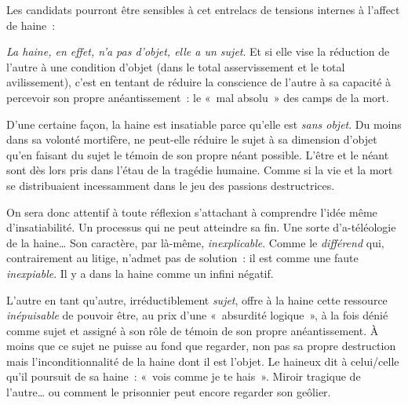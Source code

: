 {Les candidats pourront être sensibles à cet entrelacs de tensions internes à
l'affect de haine~:

\textit{La haine, en effet, n'a pas d'objet, elle a un sujet}. Et si elle vise la réduction de
l'autre à une condition d'objet (dans le total asservissement et le total
avilissement), c'est en tentant de réduire la conscience de l'autre à sa capacité à
percevoir son propre anéantissement~: le «~mal absolu~» des camps de la mort.

D'une certaine façon, la haine est insatiable parce qu'elle est \textit{sans objet}. Du
moins dans sa volonté mortifère, ne peut-elle réduire le sujet à sa dimension
d'objet qu'en faisant du sujet le témoin de son propre néant possible. L'être et le
néant sont dès lors pris dans l'étau de la tragédie humaine. Comme si la vie et la
mort se distribuaient incessamment dans le jeu des passions destructrices.

On sera donc attentif à toute réflexion s'attachant à comprendre l'idée même
d'insatiabilité. Un processus qui ne peut atteindre sa fin. Une sorte d'a-téléologie
de la haine… Son caractère, par là-même, \textit{inexplicable}. Comme le \textit{différend} qui,
contrairement au litige, n'admet pas de solution~: il est comme une faute
\textit{inexpiable}. Il y a dans la haine comme un infini négatif.

L'autre en tant qu'autre, irréductiblement \textit{sujet}, offre à la haine cette ressource
\textit{inépuisable} de pouvoir être, au prix d'une «~absurdité logique~», à la fois dénié
comme sujet et assigné à son rôle de témoin de son propre anéantissement. À
moins que ce sujet ne puisse au fond que regarder, non pas sa propre destruction
mais l'inconditionnalité de la haine dont il est l'objet. Le haineux dit à celui/celle
qu'il poursuit de sa haine~: «~vois comme je te hais~». Miroir tragique de l'autre…
ou comment le prisonnier peut encore regarder son geôlier.}%
